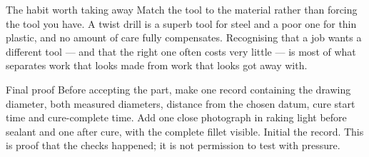 
\begin{telospanel}{The habit worth taking away}
Match the tool to the material rather than forcing the tool you have. A twist
drill is a superb tool for steel and a poor one for thin plastic, and no amount
of care fully compensates. Recognising that a job wants a different tool --- and
that the right one often costs very little --- is most of what separates work
that looks made from work that looks got away with.
\end{telospanel}

\begin{telospanel}{Final proof}
Before accepting the part, make one record containing the drawing diameter,
both measured diameters, distance from the chosen datum, cure start time and
cure-complete time. Add one close photograph in raking light before sealant and
one after cure, with the complete fillet visible. Initial the record. This is
proof that the checks happened; it is not permission to test with pressure.
\end{telospanel}

